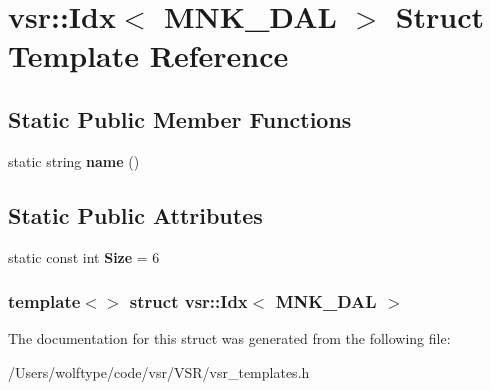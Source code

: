 \hypertarget{structvsr_1_1_idx_3_01_m_n_k___d_a_l_01_4}{\section{vsr\-:\-:Idx$<$ M\-N\-K\-\_\-\-D\-A\-L $>$ Struct Template Reference}
\label{structvsr_1_1_idx_3_01_m_n_k___d_a_l_01_4}
}
\subsection*{Static Public Member Functions}
\begin{DoxyCompactItemize}
\item 
\hypertarget{structvsr_1_1_idx_3_01_m_n_k___d_a_l_01_4_ad910717847a4cd7d2b661c0bd5247741}{static string {\bfseries name} ()}\label{structvsr_1_1_idx_3_01_m_n_k___d_a_l_01_4_ad910717847a4cd7d2b661c0bd5247741}

\end{DoxyCompactItemize}
\subsection*{Static Public Attributes}
\begin{DoxyCompactItemize}
\item 
\hypertarget{structvsr_1_1_idx_3_01_m_n_k___d_a_l_01_4_a9a040d22c231e6cde830e69ff1a8836b}{static const int {\bfseries Size} = 6}\label{structvsr_1_1_idx_3_01_m_n_k___d_a_l_01_4_a9a040d22c231e6cde830e69ff1a8836b}

\end{DoxyCompactItemize}
\subsubsection*{template$<$$>$ struct vsr\-::\-Idx$<$ M\-N\-K\-\_\-\-D\-A\-L $>$}



The documentation for this struct was generated from the following file\-:\begin{DoxyCompactItemize}
\item 
/\-Users/wolftype/code/vsr/\-V\-S\-R/vsr\-\_\-templates.\-h\end{DoxyCompactItemize}
